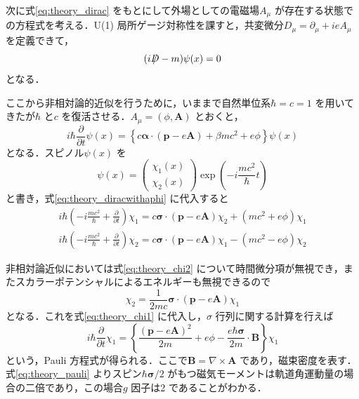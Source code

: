 	次に式\eqref{eq:theory_dirac} をもとにして外場としての電磁場$A_{\mu}$ が存在する状態での方程式を考える．U(1) 局所ゲージ対称性を課すと，共変微分$D_{\mu} = \partial_{\mu} + ieA_{\mu}$ を定義できて，
	\begin{equation}
	(i\Slash{D} - m)\psi(x) = 0
	\label{eq:theory_diracwitha}
	\end{equation}
となる．

	ここから非相対論的近似を行うために，いままで自然単位系$\hbar = c = 1$ を用いてきたが$\hbar$ と$c$ を復活させる．$A_{\mu} = (\phi, \bm{A})$ とおくと，
	\begin{equation}
	i\hbar\frac{\partial}{\partial t}\psi(x) = \left\{c\bm{\alpha}\cdot (\bm{p} - e\bm{A}) + \beta m c^{2} + e \phi\right\}\psi(x)
	\label{eq:theory_diracwithaphi}
	\end{equation}
	となる．スピノル$\psi(x)$ を
	\begin{equation}
	\psi(x) = \begin{pmatrix}
			\chi_{1} (x)\\
			\chi_{2} (x)
			\end{pmatrix} \exp \left( - i \frac{mc^{2}}{\hbar} t\right)
	\end{equation}
	と書き，式\eqref{eq:theory_diracwithaphi} に代入すると
	\begin{align}
	i\hbar\left( -i\frac{mc^{2}}{\hbar} + \frac{\partial}{\partial t}\right) \chi_{1} = c\bm{\sigma}\cdot(\bm{p} - e \bm{A})\chi_{2} + (mc^{2} + e\phi)\chi_{1} \label{eq:theory_chi1}\\ 
	i\hbar\left( -i\frac{mc^{2}}{\hbar} + \frac{\partial}{\partial t}\right) \chi_{2} = c\bm{\sigma}\cdot(\bm{p} - e \bm{A})\chi_{1} - (mc^{2} - e\phi)\chi_{2} \label{eq:theory_chi2}
	\end{align}

	非相対論近似においては式\eqref{eq:theory_chi2} について時間微分項が無視でき，またスカラーポテンシャルによるエネルギーも無視できるので
	\begin{equation}
	\chi_{2} = \frac{1}{2mc}\bm{\sigma}\cdot(\bm{p} - e\bm{A})\chi_{1}
	\end{equation}
	となる．これを式\eqref{eq:theory_chi1} に代入し，$\sigma$ 行列に関する計算を行えば
	\begin{equation}
	i\hbar\frac{\partial}{\partial t}\chi_{1} = \left\{\frac{(\bm{p} - e\bm{A})^{2}}{2m} + e\phi - \frac{e\hbar\bm{\sigma}}{2m}\cdot\bm{B}\right\}\chi_{1}
	\label{eq:theory_pauli}
	\end{equation}
	という，Pauli 方程式が得られる．ここで$\bm{B} = \nabla \times \bm{A}$ であり，磁束密度を表す．式\eqref{eq:theory_pauli} よりスピン$\hbar\bm{\sigma}/2$ がもつ磁気モーメントは軌道角運動量の場合の二倍であり，この場合$g$ 因子は2 であることがわかる．

